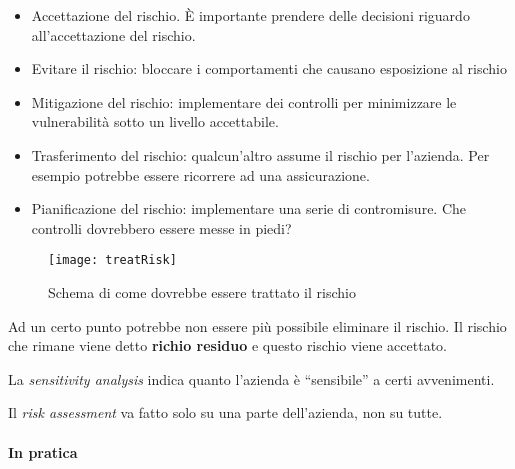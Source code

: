\begin{itemize}
\item Accettazione del rischio. È importante prendere delle decisioni riguardo
all'accettazione del rischio.
\item Evitare il rischio: bloccare i comportamenti che causano esposizione al
rischio
\item Mitigazione del rischio: implementare dei controlli per minimizzare le
vulnerabilità sotto un livello accettabile.
\item Trasferimento del rischio: qualcun'altro assume il rischio per l'azienda.
Per esempio potrebbe essere ricorrere ad una assicurazione.
\item Pianificazione del rischio: implementare una serie di contromisure. Che
controlli dovrebbero essere messe in piedi?
\end{itemize}

\begin{figure}[H]
 \centering
 \texttt{[image: treatRisk]}
 \caption{Schema di come dovrebbe essere trattato il rischio}
\end{figure}



Ad un certo punto potrebbe non essere più possibile eliminare il rischio. Il
rischio che rimane viene detto \textbf{richio residuo} e questo rischio viene
accettato.

La \textit{sensitivity analysis} indica quanto l'azienda è ``sensibile'' a certi
avvenimenti.

Il \textit{risk assessment} va fatto solo su una parte dell'azienda, non su
tutte.


\paragraph*{In pratica}

